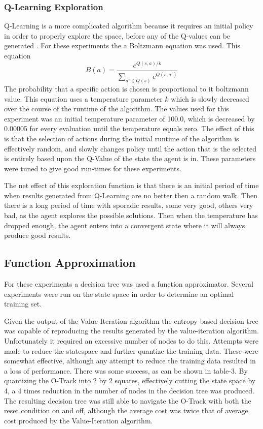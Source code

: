 \documentclass[12pt,letterpaper]{article}
\begin{document}
\subsubsection*{Q-Learning Exploration}
Q-Learning is a more complicated algorithm because it requires an initial policy in order to properly explore the space, before any of the Q-values can be generated \cite{wiki}. For these experiments the a Boltzmann equation was used. This equation 
\[
B(a)=\frac{e^{Q(s,a)/k}}{\displaystyle\sum_{a'\in Q(s)}e^{Q(s,a')}}
\]
The probability that a specific action is chosen is proportional to it boltzmann value. This equation uses a temperature parameter $k$ which is slowly decreased over the course of the runtime of the algorithm. The values used for this experiment was an initial temperature parameter of 100.0, which is decreased by 0.00005 for every evaluation until the temperature equals zero. The effect of this is that the selection of actions during the initial runtime of the algorithm is effectively random, and slowly changes policy until the action that is the selected is entirely based upon the Q-Value of the state the agent is in. These parameters were tuned to give good run-times for these experiments. 

The net effect of this exploration function is that there is an initial period of time when results generated from Q-Learning are no better then a random walk. Then there is a long period of time with sporadic results, some very good, others very bad, as the agent explores the possible solutions. Then when the temperature has dropped enough, the agent enters into a convergent state where it will always produce good results. 

\subsection{Function Approximation}
For these experiments a decision tree was used a function approximator. Several experiments were run on the state space in order to determine an optimal training set. 

Given the output of the Value-Iteration algorithm the entropy based decision tree was capable of reproducing the results generated by the value-iteration algorithm. Unfortunately it required an excessive number of nodes to do this. Attempts were made to reduce the statespace and further quantize the training data. These were somewhat effective, although any attempt to reduce the training data resulted in a loss of performance. There was some success, as can be shown in table-3. By quantizing the O-Track into 2 by 2 squares, effectively cutting the state space by 4, a 4 times reduction in the number of nodes in the decision tree was produced. The resulting decision tree was still able to navigate the O-Track with both the reset condition on and off, although the average cost was twice that of average cost produced by the Value-Iteration algorithm.  
\end{document}
